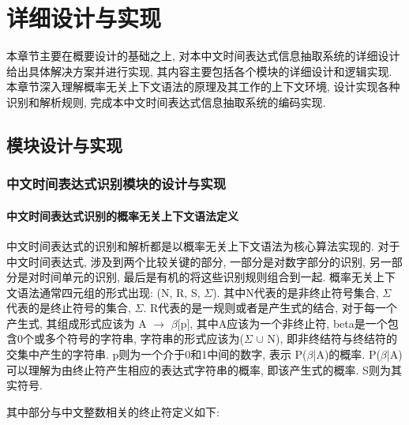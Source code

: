 
\chapter{详细设计与实现}

本章节主要在概要设计的基础之上, 对本中文时间表达式信息抽取系统的详细设计给出具体解决方案并进行实现, 其内容主要包括各个模块的详细设计和逻辑实现.
本章节深入理解概率无关上下文语法的原理及其工作的上下文环境, 设计实现各种识别和解析规则, 完成本中文时间表达式信息抽取系统的编码实现.

\section{模块设计与实现}

\subsection{中文时间表达式识别模块的设计与实现}

\subsubsection{中文时间表达式识别的概率无关上下文语法定义}

中文时间表达式的识别和解析都是以概率无关上下文语法为核心算法实现的.
对于中文时间表达式, 涉及到两个比较关键的部分, 一部分是对数字部分的识别, 另一部分是对时间单元的识别, 最后是有机的将这些识别规则组合到一起.
概率无关上下文语法通常四元组的形式出现: (N, R, S,  $\varSigma$). 其中N代表的是非终止符号集合, $\varSigma$ 代表的是终止符号的集合, $\varSigma$.
R代表的是一规则或者是产生式的结合, 对于每一个产生式, 其组成形式应该为 A $\rightarrow$ $\beta$[p], 其中A应该为一个非终止符, beta是一个包含0个或多个符号的字符串,
字符串的形式应该为($\varSigma$ $\cup$ N), 即非终结符与终结符的交集中产生的字符串. p则为一个介于0和1中间的数字, 表示 P($\beta$|A)的概率.
P($\beta$|A)可以理解为由终止符产生相应的表达式字符串的概率, 即该产生式的概率.
S则为其实符号.

其中部分与中文整数相关的终止符定义如下:

